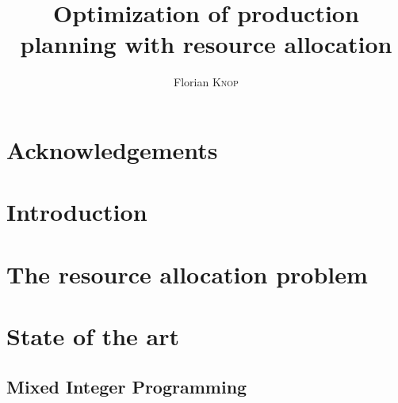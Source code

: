 \documentclass{template/EPL-master-thesis-covers-EN}
\title{Optimization of production planning with resource allocation}
\author{Florian \textsc{Knop}}
\begin{document}
  \def\chapterautorefname{Chapter}
  \def\sectionautorefname{Section}
  \def\subsectionautorefname{Subsection}
  \newcommand*{\Appendixautorefname}{Appendix}
  \newcommand{\vone}{Village n\textsuperscript{o}1}

  
  \maketitle






  \begin{abstract}
    \normalsize
    \lipsum[1]
  \end{abstract}


  \chapter*{Acknowledgements}

  
  
  \tableofcontents


  \listoffigures

  \listoftables




  \chapter{Introduction}
  \label{chapter:introduction}
  


  \chapter{The resource allocation problem}
  \label{chapter:problem}
  


  \chapter{State of the art}
  \label{chapter:sota}

  

  \section{Mixed Integer Programming}
  
\end{document}
